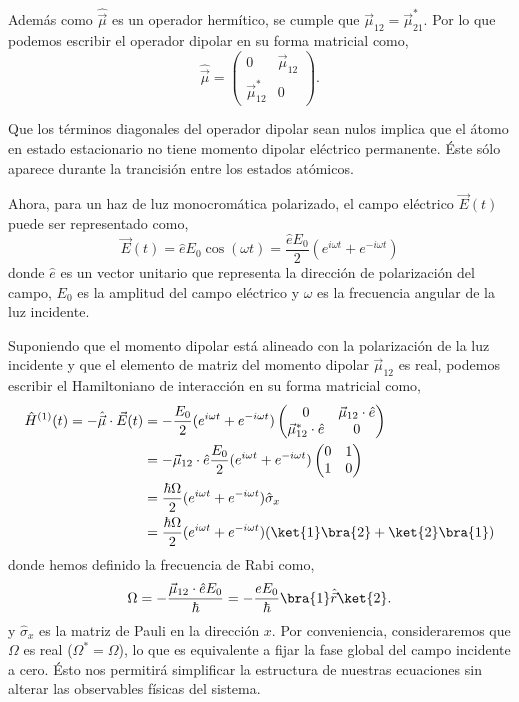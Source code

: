 Además como $\hat{\vec{\mu}}$ es un operador hermítico, se cumple que $\vec{\mu}_{12} = \vec{\mu}_{21}^*$. Por lo que podemos escribir el operador dipolar en su forma matricial como,
\begin{equation}
    \hat{\vec{\mu}} = \begin{pmatrix}
    0 & \vec{\mu}_{12} \\
    \vec{\mu}_{12}^* & 0
    \end{pmatrix}.
\end{equation}

Que los términos diagonales del operador dipolar sean nulos implica que el átomo en estado estacionario no tiene momento dipolar eléctrico permanente. Éste sólo aparece durante la trancisión entre los estados atómicos.

Ahora, para un haz de luz monocromática polarizado, el campo eléctrico $\vec{E}(t)$ puede ser representado como,
\begin{equation}
    \vec{E}(t) = \hat{e} E_0 \cos(\omega t) = \frac{\hat{e} E_0}{2} (e^{i \omega t} + e^{-i \omega t})
\end{equation}
donde $\hat{e}$ es un vector unitario que representa la dirección de polarización del campo, $E_0$ es la amplitud del campo eléctrico y $\omega$ es la frecuencia angular de la luz incidente.

Suponiendo que el momento dipolar está alineado con la polarización de la luz incidente y que el elemento de matriz del momento dipolar $\vec{\mu}_{12}$ es real, podemos escribir el Hamiltoniano de interacción en su forma matricial como,
\begin{equation}
\begin{split}
    \hat{H}^{(1)}(t) = - \hat{\vec{\mu}} \cdot \vec{E}(t) 
    &= - \frac{E_0}{2} (e^{i \omega t} + e^{-i \omega t}) \begin{pmatrix}
    0 & \vec{\mu}_{12} \cdot \hat{e} \\
    \vec{\mu}_{12}^* \cdot \hat{e} & 0
    \end{pmatrix}\\
    &= - \vec{\mu}_{12} \cdot \hat{e} \frac{E_0}{2} (e^{i \omega t} + e^{-i \omega t}) \begin{pmatrix}
    0 & 1 \\
    1 & 0
    \end{pmatrix}\\
    &= \frac{\hbar \Omega}{2} (e^{i \omega t} + e^{-i \omega t}) \hat{\sigma}_x\\
    &= \frac{\hbar \Omega}{2} (e^{i \omega t} + e^{-i \omega t})(\ket{1}\bra{2} + \ket{2}\bra{1})
\end{split}
\end{equation}
donde hemos definido la frecuencia de Rabi como,
\begin{equation}    
    \Omega = - \frac{\vec{\mu}_{12} \cdot \hat{e} E_0}{\hbar} = - \frac{e E_0}{\hbar} \bra{1} \hat{\vec{r}} \ket{2}.
\end{equation}
y $\hat{\sigma}_x$ es la matriz de Pauli en la dirección $x$. Por conveniencia, consideraremos que $\Omega$ es real ($\Omega^* = \Omega$), lo que es equivalente a fijar la fase global del campo incidente a cero. Ésto nos permitirá simplificar la estructura de nuestras ecuaciones sin alterar las observables físicas del sistema.
